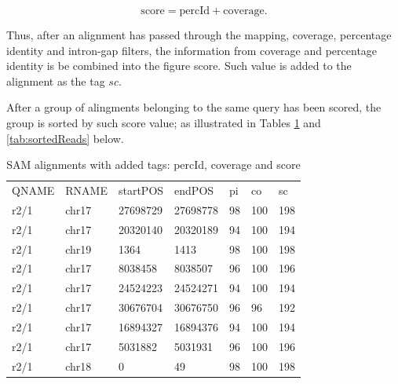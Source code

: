 \documentclass[11pt]{article}
\newcommand{\option}[1]{{\fontfamily{phv}\selectfont#1}}
\begin{document}
{\begin{equation}
	\mathrm{score} = \mathrm{percId} + \mathrm{coverage}.
\label{eq:score}
\end{equation}

Thus, after an alignment has passed through the mapping, coverage, percentage identity and intron-gap 
filters, the information from coverage and percentage identity is be combined into the figure \option{score}.
Such value is added to the alignment as the tag $sc$. 

After a group of alingments belonging to the same query has been scored, the group is sorted by such score 
value; as illustrated in Tables \ref{tab:singleReads} and \ref{tab:sortedReads} below.

\begin{landscape}
  \begin{table}\footnotesize
\begin{center}
    \begin{tabular*}{0.75\textwidth}{|l|l|l|l|l|l|l|}
	\cline{1-7}
	  QNAME & RNAME & startPOS & endPOS & pi & co & sc \\ \cline{1-7}
      r2/1 & chr17 & 27698729 & 27698778 & 98 & 100 & 198 \\ \cline{1-7}
      r2/1 & chr17 & 20320140 & 20320189 & 94 & 100 & 194 \\ \cline{1-7}
      r2/1 & chr19 & 1364 & 1413 & 98 & 100 & 198 \\ \cline{1-7}
      r2/1 & chr17 & 8038458 & 8038507 & 96 & 100 & 196 \\ \cline{1-7}
      r2/1 & chr17 & 24524223 & 24524271 & 94 & 100 & 194 \\ \cline{1-7}
      r2/1 & chr17 & 30676704 & 30676750 & 96 & 96 & 192 \\ \cline{1-7}
      r2/1 & chr17 & 16894327 & 16894376 & 94 & 100 & 194 \\ \cline{1-7}
      r2/1 & chr17 & 5031882 & 5031931 & 96 & 100 & 196 \\ \cline{1-7}
      r2/1 & chr18 & 0 & 49 & 98 & 100 & 198 \\ \cline{1-7}
    \end{tabular*}
    \caption{SAM alignments with added tags: percId, coverage and score}
    \label{tab:singleReads}
\end{center}
  \end{table}



\end{landscape}}
\end{document}
